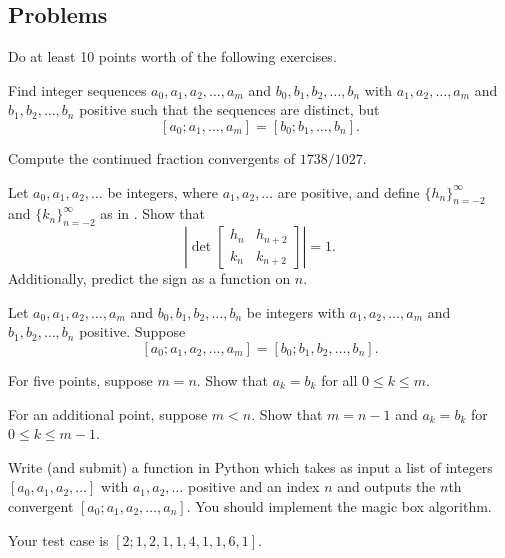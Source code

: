 \documentclass[../notes.tex]{subfiles}
\begin{document}
\subsection{Problems}
Do at least 10 points worth of the following exercises.
\begin{prob}[1 point]
	Find integer sequences $a_0,a_1,a_2,\ldots,a_m$ and $b_0,b_1,b_2,\ldots,b_n$ with $a_1,a_2,\ldots,a_m$ and $b_1,b_2,\ldots,b_n$ positive such that the sequences are distinct, but
	\[[a_0;a_1,\ldots,a_m]=[b_0;b_1,\ldots,b_n].\]
\end{prob}
\begin{prob}[2 points]
	Compute the continued fraction convergents of $1738/1027$.
\end{prob}
\begin{prob}[3 points]
	Let $a_0,a_1,a_2,\ldots$ be integers, where $a_1,a_2,\ldots$ are positive, and define $\{h_n\}_{n=-2}^\infty$ and $\{k_n\}_{n=-2}^\infty$ as in . Show that
	\[\left|\det\begin{bmatrix}
		h_n & h_{n+2} \\
		k_n & k_{n+2}
	\end{bmatrix}\right|=1.\]
	Additionally, predict the sign as a function on $n$.
\end{prob}
\begin{prob}[5 or 6 points]
	Let $a_0,a_1,a_2,\ldots,a_m$ and $b_0,b_1,b_2,\ldots,b_n$ be integers with $a_1,a_2,\ldots,a_m$ and $b_1,b_2,\ldots,b_n$ positive. Suppose
	\[[a_0;a_1,a_2,\ldots,a_m]=[b_0;b_1,b_2,\ldots,b_n].\]
	\begin{listalph}
		\item For five points, suppose $m=n$. Show that $a_k=b_k$ for all $0\le k\le m$.
		\item For an additional point, suppose $m<n$. Show that $m=n-1$ and $a_k=b_k$ for $0\le k\le m-1$.
	\end{listalph}
\end{prob}
\begin{prob}[5 points]
	Write (and submit) a function in Python which takes as input a list of integers $[a_0,a_1,a_2,\ldots]$ with $a_1,a_2,\ldots$ positive and an index $n$ and outputs the $n$th convergent $[a_0;a_1,a_2,\ldots,a_n]$. You should implement the magic box algorithm.
	
	Your test case is $[2;1,2,1,1,4,1,1,6,1]$.
\end{prob}
\end{document}
